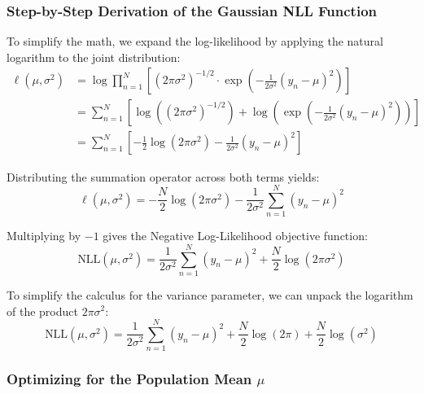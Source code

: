 \documentclass{article}
\begin{document}
\subsubsection{Step-by-Step Derivation of the Gaussian NLL Function}

To simplify the math, we expand the log-likelihood by applying the natural logarithm to the joint distribution:
\begin{align*}
\ell(\mu, \sigma^2) &= \log \prod_{n=1}^N \left[ (2\pi\sigma^2)^{-1/2} \cdot \exp\left( -\frac{1}{2\sigma^2}(y_n - \mu)^2 \right) \right] \\
&= \sum_{n=1}^N \left[ \log\left((2\pi\sigma^2)^{-1/2}\right) + \log\left(\exp\left( -\frac{1}{2\sigma^2}(y_n - \mu)^2 \right)\right) \right] \\
&= \sum_{n=1}^N \left[ -\frac{1}{2}\log(2\pi\sigma^2) - \frac{1}{2\sigma^2}(y_n - \mu)^2 \right]
\end{align*}

Distributing the summation operator across both terms yields:
\begin{equation}
\ell(\mu, \sigma^2) = -\frac{N}{2}\log(2\pi\sigma^2) - \frac{1}{2\sigma^2}\sum_{n=1}^N (y_n - \mu)^2
\end{equation}

Multiplying by $-1$ gives the Negative Log-Likelihood objective function:
\begin{equation}
\text{NLL}(\mu, \sigma^2) = \frac{1}{2\sigma^2}\sum_{n=1}^N (y_n - \mu)^2 + \frac{N}{2}\log(2\pi\sigma^2)
\end{equation}

To simplify the calculus for the variance parameter, we can unpack the logarithm of the product $2\pi\sigma^2$:
\begin{equation}
\text{NLL}(\mu, \sigma^2) = \frac{1}{2\sigma^2}\sum_{n=1}^N (y_n - \mu)^2 + \frac{N}{2}\log(2\pi) + \frac{N}{2}\log(\sigma^2)
\end{equation}

\subsubsection{Optimizing for the Population Mean $\mu$}
\end{document}

